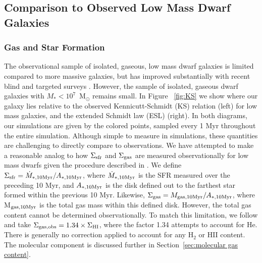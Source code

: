 \documentclass[twocolumn]{aastex61}
\begin{document}
\label{sec:discussion}

\subsection{Comparison to Observed Low Mass Dwarf Galaxies}
\label{sec:observation}

\subsubsection{Gas and Star Formation}
\label{sec:gas_sf}

The observational sample of isolated, gaseous, low mass dwarf galaxies is limited compared to more massive galaxies, but has improved substantially with recent blind and targeted  surveys \citep[e.g.][]{Giovanelli2005, Geha2006, Geha2012, Walter2008, Cannon2011, Haynes2011, Hunter2012, Bradford2015, James2015, Tollerud2015, Sand2015, Wang2017}. However, the sample of isolated, gaseous dwarf galaxies with $M_{*} < 10^{7}$~M$_{\odot}$ remains small. In Figure ~\ref{fig:KS} we show where our galaxy lies relative to the observed Kennicutt-Schmidt (KS) relation (left) for low mass galaxies, and the extended Schmidt law (ESL) (right). In both diagrams, our simulations are given by the colored points, sampled every 1 Myr throughout the entire simulation. Although simple to measure in simulations, these quantities are challenging to directly compare to observations. We have attempted to make a reasonable analog to how $\Sigma_{\rm sfr}$ and $\Sigma_{\rm gas}$ are measured observationally for low mass dwarfs given the procedure described in \citet{Roychowdhury2014}. We define $\Sigma_{\rm sfr} = \dot{M}_{*, \rm{10 Myr}} / A_{*, \rm{10 Myr}}$, where $\dot{M}_{*, \rm{10 Myr}}$ is the SFR measured over the preceding 10 Myr, and $A_{*, \rm{10 Myr}}$ is the disk defined out to the farthest star formed within the previous 10 Myr. Likewise, $\Sigma_{\rm gas} = M_{\rm gas, 10 Myr} / A_{*, \rm{10 Myr}}$, where M$_{\rm gas, 10 Myr}$ is the total gas mass within this defined disk. However, the total gas content cannot be determined observationally. To match this limitation, we follow \cite{Roychowdhury2014} and take $\Sigma_{\rm gas, obs} = 1.34 \times \Sigma_{\rm HI}$, where the factor 1.34 attempts to account for He. There is generally no correction applied to account for any H$_{2}$ or HII content. The molecular component is discussed further in Section~\ref{sec:molecular gas content}.
\end{document}
